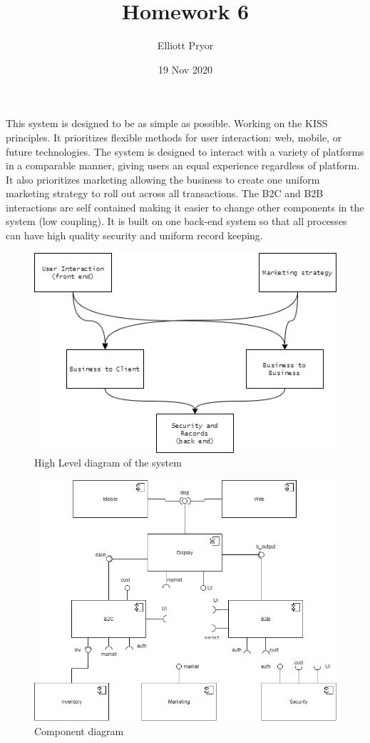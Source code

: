 \documentclass[11pt]{article}
\title{Homework 6}
\author{Elliott Pryor}
\date{19 Nov 2020}
\begin{document}
\maketitle


This system is designed to be as simple as possible. Working on the KISS principles. It prioritizes flexible methods for user interaction: web, mobile, or future technologies. 
The system is designed to interact with a variety of platforms in a comparable manner, giving users an equal experience regardless of platform.
It also prioritizes marketing allowing the business to create one uniform marketing strategy to roll out across all transactions.
The B2C and B2B interactions are self contained making it easier to change other components in the system (low coupling). 
It is built on one back-end system so that all processes can have high quality security and uniform record keeping. 

\begin{figure}[H]
    \centering
    \includegraphics[scale = 0.7]{./p1_high_level.png}
    \caption{High Level diagram of the system}
    \label{fig:high level}
\end{figure}

\newpage
{}
\begin{figure}[H]
    \centering
    \includegraphics[width = 0.8\linewidth]{./p2_component.png}
    \caption{Component diagram}
    \label{fig:component}
\end{figure}
\end{document}
